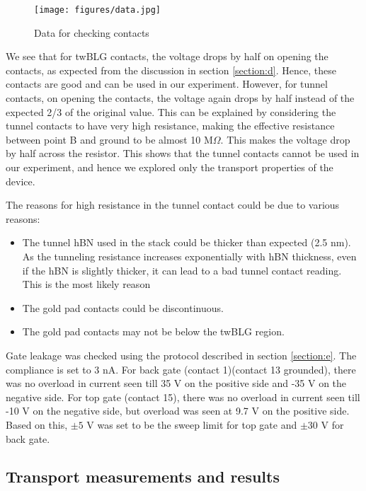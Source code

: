 \begin{figure}[H]
	\centering
	\texttt{[image: figures/data.jpg]}
	\caption{Data for checking contacts}
	\label{fig:data}
\end{figure}

We see that for twBLG contacts, the voltage drops by half on opening the contacts, as expected from the discussion in section \ref{section:d}. Hence, these contacts are good and can be used in our experiment. However, for tunnel contacts, on opening the contacts, the voltage again drops by half instead of the expected 2/3 of the original value. This can be explained by considering the tunnel contacts to have very high resistance, making the effective resistance between point B and ground to be almost 10 M$\Omega$. This makes the voltage drop by half across the resistor. This shows that the tunnel contacts cannot be used in our experiment, and hence we explored only the transport properties of the device.

The reasons for high resistance in the tunnel contact could be due to various reasons:
\begin{itemize}
	\item The tunnel hBN used in the stack could be thicker than expected (2.5 nm). As the tunneling resistance increases exponentially with hBN thickness, even if the hBN is slightly thicker, it can lead to a bad tunnel contact reading. This is the most likely reason
	\item The gold pad contacts could be discontinuous.
	\item The gold pad contacts may not be below the twBLG region.
\end{itemize}

Gate leakage was checked using the protocol described in section \ref{section:e}. The compliance is set to 3 nA. For back gate (contact 1)(contact 13 grounded), there was no overload in current seen till 35 V on the positive side and -35 V on the negative side. For top gate (contact 15), there was no overload in current seen till -10 V on the negative side, but overload was seen at 9.7 V on the positive side. Based on this, $\pm 5$ V was set to be the sweep limit for top gate and $\pm 30$ V for back gate. 




\subsection{Transport measurements and results}

